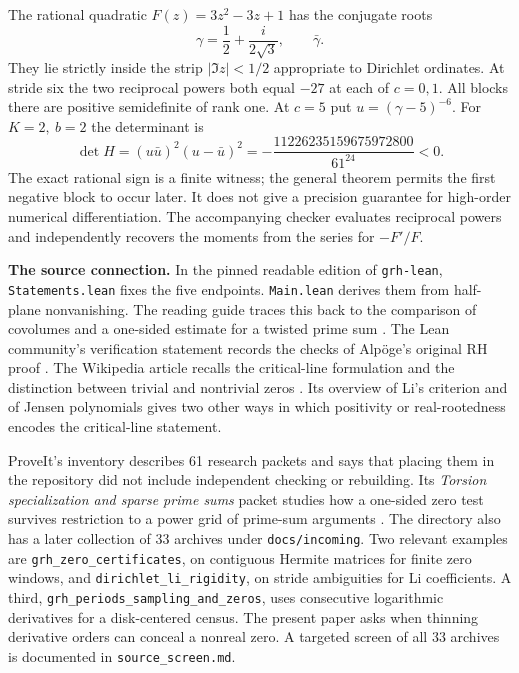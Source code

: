 \documentclass[11pt,letterpaper]{article}
\newcommand{\heading}[1]{\medskip\noindent{\large\bfseries\color{ink}#1}\par}
\begin{document}
\newpage
\heading{8. A worked example and comparison with the sources}
The rational quadratic \(F(z)=3z^2-3z+1\) has the conjugate roots
\[
 \gamma=\frac12+\frac{i}{2\sqrt3},\qquad \bar\gamma .
\]
They lie strictly inside the strip \(|\Im z|<1/2\) appropriate to Dirichlet ordinates. At stride six the two reciprocal powers both equal \(-27\) at each of \(c=0,1\). All blocks there are positive semidefinite of rank one. At \(c=5\) put \(u=(\gamma-5)^{-6}\). For \(K=2,\ b=2\) the determinant is
\[
 \det H = (u\bar u)^2(u-\bar u)^2
 = -\frac{11226235159675972800}{61^{24}}<0.
\]
The exact rational sign is a finite witness; the general theorem permits the first negative block to occur later. It does not give a precision guarantee for high-order numerical differentiation. The accompanying checker evaluates reciprocal powers and independently recovers the moments from the series for \(-F'/F\).

\textbf{The source connection.} In the pinned readable edition of \texttt{grh-lean}, \texttt{Statements.lean} fixes the five endpoints. \texttt{Main.lean} derives them from half-plane nonvanishing. The reading guide traces this back to the comparison of covolumes and a one-sided estimate for a twisted prime sum \cite{grh}. The Lean community's verification statement records the checks of Alp\"oge's original RH proof \cite{verification}. The Wikipedia article recalls the critical-line formulation and the distinction between trivial and nontrivial zeros \cite{wiki}. Its overview of Li's criterion and of Jensen polynomials gives two other ways in which positivity or real-rootedness encodes the critical-line statement.

ProveIt's inventory describes 61 research packets and says that placing them in the repository did not include independent checking or rebuilding. Its \emph{Torsion specialization and sparse prime sums} packet studies how a one-sided zero test survives restriction to a power grid of prime-sum arguments \cite{proveit}. The directory also has a later collection of 33 archives under \texttt{docs/incoming}. Two relevant examples are \texttt{grh\_zero\_certificates}, on contiguous Hermite matrices for finite zero windows, and \texttt{dirichlet\_li\_rigidity}, on stride ambiguities for Li coefficients. A third, \texttt{grh\_periods\_sampling\_and\_zeros}, uses consecutive logarithmic derivatives for a disk-centered census. The present paper asks when thinning derivative orders can conceal a nonreal zero. A targeted screen of all 33 archives is documented in \texttt{source\_screen.md}.
\end{document}
